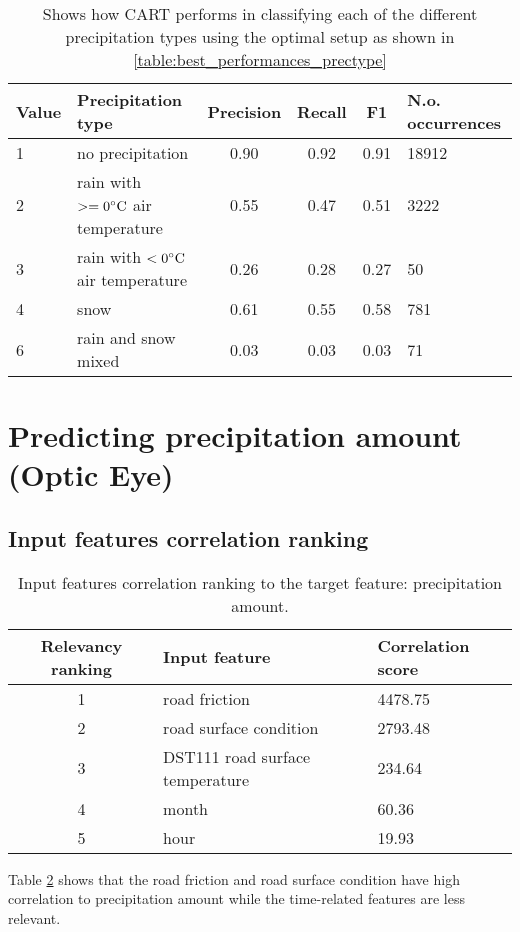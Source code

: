 	\begin{table}[H]
		\centering
		\caption{Shows how CART performs in classifying each of the different precipitation types using the optimal setup as shown in \ref{table:best_performances_prectype}}
		\begin{tabular}[6]{l |l | c | c | c | l }
    			Value & Precipitation type & Precision & Recall & F1 & N.o. occurrences \\
			\hline
			1 & no precipitation & 0.90 & 0.92 & 0.91 & 18912 \\ \hline
			2 & rain with $>= 0 \celsius$ air temperature & 0.55 & 0.47 & 0.51 & 3222 \\ \hline
			3 & rain with $< 0 \celsius$ air temperature & 0.26 & 0.28 & 0.27 & 50 \\ \hline
			4 & snow & 0.61 & 0.55 & 0.58 & 781 \\ \hline
			6 & rain and snow mixed & 0.03 & 0.03 & 0.03 & 71
			\label{table:classreport_prectype}
		\end{tabular}
	\end{table}



\section{Predicting precipitation amount (Optic Eye)} 
	\subsection{Input features correlation ranking}

	\begin{table}[H]
		\centering
		\caption{Input features correlation ranking to the target feature: precipitation amount. }
		\begin{tabular}[3]{c | l | l }
    			Relevancy ranking & Input feature & Correlation score  \\
			 \hline
			1 & road friction & 4478.75 \\ \hline
			2 & road surface condition & 2793.48 \\ \hline
			3 & DST111 road surface temperature & 234.64 \\ \hline
			4 & month & 60.36 \\ \hline
			5 & hour & 19.93 
			\label{table:feature_comparison_precamount}
		\end{tabular}
	\end{table}

		Table \ref{table:feature_comparison_precamount} shows that the road friction and road surface condition have high correlation to precipitation amount while the time-related features are less relevant. 


